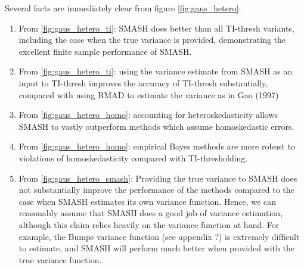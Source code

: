 \documentclass[12pt]{article}
\begin{document}
Several facts are immediately clear from figure \ref{fig:gaus_hetero}: 
\begin{enumerate}
\item From \ref{fig:gaus_hetero_ti}: SMASH does better than all TI-thresh variants, including the case when the true variance is provided, demonstrating the excellent finite sample performance of SMASH.
\item From \ref{fig:gaus_hetero_ti}: using the variance estimate from SMASH as an input to TI-thresh improves the accuracy of TI-thresh substantially, compared with using RMAD to estimate the variance as in Gao (1997)
\item From \ref{fig:gaus_hetero_homo}: accounting for heteroskedasticity allows SMASH to vastly outperform methods which assume homoskedastic errors.
\item From \ref{fig:gaus_hetero_homo}: empirical Bayes methods are more robust to violations of homoskedasticity compared with TI-thresholding.
\item From \ref{fig:gaus_hetero_smash}: Providing the true variance to SMASH does not substantially improve the performance of the methods compared to the case when SMASH estimates its own variance function. Hence, we can reasonably assume that SMASH does a good job of variance estimation, although this claim relies heavily on the variance function at hand. For example, the Bumps variance function (see appendix ?) is extremely difficult to estimate, and SMASH will perform much better when provided with the true variance function.
\end{enumerate}
\end{document}
